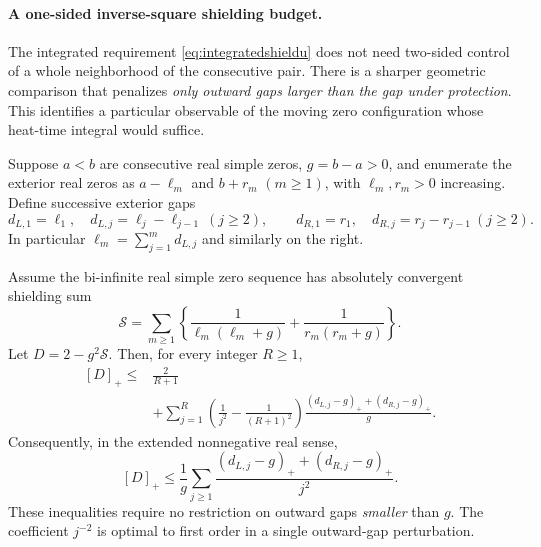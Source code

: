 \paragraph{A one-sided inverse-square shielding budget.}
\label{par:one-sided-shielding}
The integrated requirement \eqref{eq:integratedshieldu}
does not need two-sided control of a whole neighborhood
of the consecutive pair. There is a sharper geometric
comparison that penalizes \emph{only outward gaps larger
than the gap under protection}. This identifies a
particular observable of the moving zero configuration
whose heat-time integral would suffice.

Suppose $a<b$ are consecutive real simple zeros,
$g=b-a>0$, and enumerate the exterior real zeros
as $a-\ell_m$ and $b+r_m$ $(m\ge1)$, with
$\ell_m,r_m>0$ increasing. Define successive
exterior gaps
\[
d_{L,1}=\ell_1,\quad
d_{L,j}=\ell_j-\ell_{j-1}\ (j\ge2),
\qquad
d_{R,1}=r_1,\quad
d_{R,j}=r_j-r_{j-1}\ (j\ge2).
\]
In particular
$\ell_m=\sum_{j=1}^m d_{L,j}$
and similarly on the right.

\begin{theorem}
\label{thm:onesidedshield}
Assume the bi-infinite real simple zero sequence
has absolutely convergent shielding sum
\[
\mathcal S=\sum_{m\ge1}
\left\{\frac1{\ell_m(\ell_m+g)}
+\frac1{r_m(r_m+g)}\right\}.
\]
Let $D=2-g^2\mathcal S$. Then, for every integer $R\ge1$,
\begin{equation}\label{eq:onesidedfinite}
\boxed{\begin{aligned}
[D]_+ \le{}&\frac2{R+1}\\
&+\sum_{j=1}^R
\left(\frac1{j^2}-\frac1{(R+1)^2}\right)
\frac{
(d_{L,j}-g)_++(d_{R,j}-g)_+}{g}.
\end{aligned}}
\end{equation}
Consequently, in the extended nonnegative real sense,
\begin{equation}\label{eq:onesidedinfinite}
\boxed{
[D]_+\le\frac1g\sum_{j\ge1}
\frac{(d_{L,j}-g)_++(d_{R,j}-g)_+}{j^2}.
}
\end{equation}
These inequalities require no restriction on
outward gaps \emph{smaller} than $g$.
The coefficient $j^{-2}$ is optimal to
first order in a single outward-gap perturbation.
\end{theorem}

